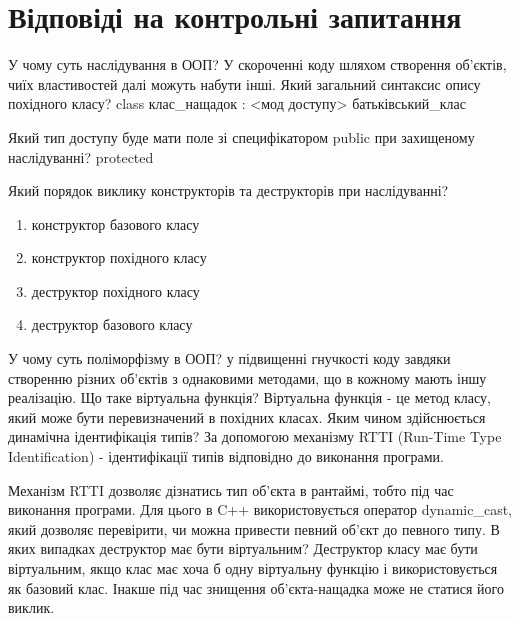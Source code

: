 \documentclass[a4paper, 12pt, oneside]{extarticle}
\begin{document}
\section*{Відповіді на контрольні запитання}
\begin{itemize}
	\question У чому суть наслідування в ООП?
	\answer У скороченні коду шляхом створення об'єктів, чиїх
		властивостей далі можуть набути інші.
	\question Який загальний синтаксис опису похідного класу?
	\answer class клас_нащадок : <мод доступу> батьківський_клас

	\question Який тип доступу буде мати поле зі специфікатором public при захищеному наслідуванні?
	\answer protected

	\question Який порядок виклику конструкторів та деструкторів при наслідуванні?
		\answer \begin{enumerate}
				\item конструктор базового класу
				\item конструктор похідного класу
				\item деструктор похідного класу
				\item деструктор базового класу
			\end{enumerate}
	\question У чому суть поліморфізму в ООП?
	\answer у підвищенні гнучкості коду завдяки створенню різних
		об'єктів з однаковими методами, що в кожному мають іншу
		реалізацію.
	\question Що таке віртуальна функція?
	\answer Віртуальна функція - це метод класу, який може бути перевизначений в похідних класах.
	\question Яким чином здійснюється динамічна ідентифікація типів?
	\answer За допомогою механізму RTTI (Run-Time Type Identification) - ідентифікації типів відповідно до виконання програми.

Механізм RTTI дозволяє дізнатись тип об'єкта в рантаймі, тобто під час виконання програми. Для цього в C++ використовується оператор dynamic_cast, який дозволяє перевірити, чи можна привести певний об'єкт до певного типу.
	\question В яких випадках деструктор має бути віртуальним?
	\answer Деструктор класу має бути віртуальним, якщо клас має хоча б одну віртуальну функцію і використовується як базовий клас. Інакше
		під час знищення об'єкта-нащадка може не статися його виклик.


\end{itemize}
\end{document}
